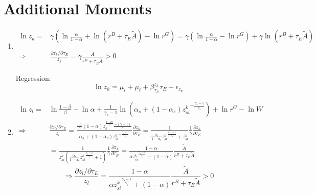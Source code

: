 \documentclass[12pt]{article} %
\begin{document}
\section*{Additional Moments}
\begin{enumerate}
    \item 
    \begin{equation*}
        \begin{split}
            \ln z_k =& {\gamma} (
            \ln \frac{\alpha}{1-\alpha} + \ln ({r^B + \tau_E\tilde{A}}) - \ln {r^G} ) =  {\gamma} (\ln \frac{\alpha}{1-\alpha} - \ln {r^G}) + {\gamma} \ln ({r^B + \tau_E\tilde{A}})\\
            \\
            \Rightarrow & \frac{\partial z_k/\partial \tau_E }{z_k} = {\gamma} \frac{\tilde{A}}{r^B + \tau_E\tilde{A}}>0
        \end{split}
    \end{equation*}

    Regression:
    \begin{equation*}
        \ln z_k = \mu_i + \mu_t + \beta_{\tau_E}^{z_k} \tau_E + \epsilon_{z_k}
    \end{equation*}



    \item 
    \begin{equation*}
        \begin{split}
            \ln z_l =& \ln \frac{1-\beta}{\beta} - \ln {\alpha} +\frac{1}{\gamma_s-1} \ln (\alpha_s  + (1-\alpha_s){z^k_{si}}^{-\frac{\gamma_s-1}{\gamma_s}}) + \ln r^G - \ln W\\
            \Rightarrow & \frac{\partial z_l/\partial \tau_E }{z_l} =  \frac{\frac{-1}{\gamma}(1-\alpha)z_k^{\frac{1-2\gamma}{\gamma}}\frac{-(\gamma-1)}{\gamma}}{\alpha_s  + (1-\alpha_s){z^k_{si}}^{-\frac{\gamma_s-1}{\gamma_s}}}
            \frac{\partial z_k}{\partial \tau_E} = 
            \frac{1}{\frac{\alpha_s}{1-\alpha_s}{z^k_{si}}^{\frac{2\gamma_s-1}{\gamma_s}}  + z^k_{si}}\frac{1}{\gamma}\frac{\partial z_k}{\partial \tau_E}\\
            & =  
            \frac{1}{z^k_{si}(\frac{\alpha_s}{1-\alpha_s}{z^k_{si}}^{\frac{\gamma_s-1}{\gamma_s}}  + 1)}\frac{1}{\gamma}\frac{\partial z_k}{\partial \tau_E} = \frac{1-\alpha}{{\alpha z^k_{si}}^{\frac{\gamma_s-1}{\gamma_s}} + (1-\alpha)}\frac{\tilde{A}}{r^B + \tau_E\tilde{A}}
        \end{split}
    \end{equation*}
    \begin{equation*}
        \Rightarrow \frac{\partial z_l/\partial \tau_E }{z_l} = \frac{1-\alpha}{{\alpha z^k_{si}}^{\frac{\gamma_s-1}{\gamma_s}} + (1-\alpha)}\frac{\tilde{A}}{r^B + \tau_E\tilde{A}} >0
    \end{equation*}


\end{enumerate}
\end{document}
